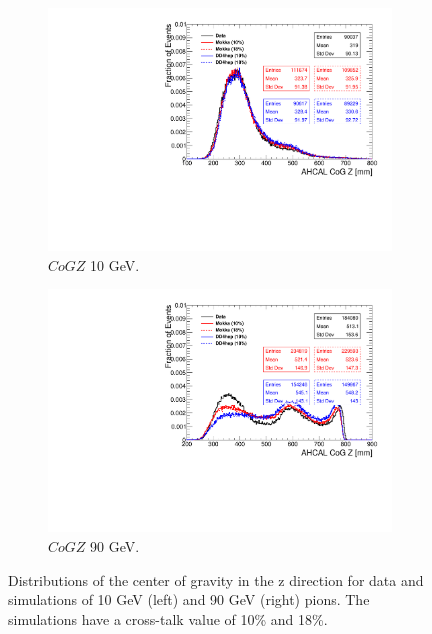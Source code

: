 \begin{figure}[htbp!]
  \centering
  \begin{subfigure}[t]{0.49\textwidth}
    \includegraphics[width=1.\linewidth]{../Thesis_Plots/Timing/Pions/Plots/Comparison_CoGZ_Xtalk_pions10GeV.pdf}
    \caption{$CoGZ$ 10 GeV.} \label{fig:pi10CoGZ}
  \end{subfigure}
  \hfill
  \begin{subfigure}[t]{0.49\textwidth}
    \includegraphics[width=1.\linewidth]{../Thesis_Plots/Timing/Pions/Plots/Comparison_CoGZ_Xtalk_pions90GeV.pdf}
    \caption{$CoGZ$ 90 GeV.} \label{fig:pi90CoGZ}
  \end{subfigure}
  \caption{Distributions of the center of gravity in the z direction for data and simulations of 10 GeV (left) and 90 GeV (right) pions. The simulations have a cross-talk value of 10\% and 18\%.}
  \label{fig:piGoGZ}
\end{figure}

